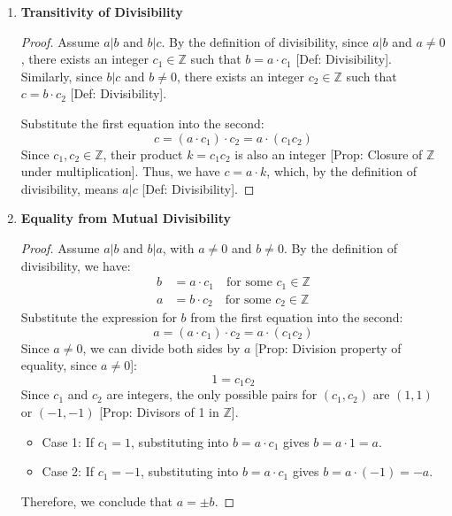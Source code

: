 \begin{enumerate}
    \item \textbf{Transitivity of Divisibility}
    \begin{proof}
        Assume $a|b$ and $b|c$. By the definition of divisibility, since $a|b$ and $a \ne 0$, there exists an integer $c_1 \in \mathbb{Z}$ such that $b = a \cdot c_1$ [Def: Divisibility].
        Similarly, since $b|c$ and $b \ne 0$, there exists an integer $c_2 \in \mathbb{Z}$ such that $c = b \cdot c_2$ [Def: Divisibility].
        
        Substitute the first equation into the second:
        $$c = (a \cdot c_1) \cdot c_2 = a \cdot (c_1 c_2)$$
        Since $c_1, c_2 \in \mathbb{Z}$, their product $k = c_1 c_2$ is also an integer [Prop: Closure of $\mathbb{Z}$ under multiplication].
        Thus, we have $c = a \cdot k$, which, by the definition of divisibility, means $a|c$ [Def: Divisibility].
    \end{proof}

    \item \textbf{Equality from Mutual Divisibility}
    \begin{proof}
        Assume $a|b$ and $b|a$, with $a \ne 0$ and $b \ne 0$.
        By the definition of divisibility, we have:
        \begin{align*}
            b &= a \cdot c_1 \quad \text{for some } c_1 \in \mathbb{Z} \\
            a &= b \cdot c_2 \quad \text{for some } c_2 \in \mathbb{Z}
        \end{align*}
        Substitute the expression for $b$ from the first equation into the second:
        $$a = (a \cdot c_1) \cdot c_2 = a \cdot (c_1 c_2)$$
        Since $a \ne 0$, we can divide both sides by $a$ [Prop: Division property of equality, since $a \ne 0$]:
        $$1 = c_1 c_2$$
        Since $c_1$ and $c_2$ are integers, the only possible pairs for $(c_1, c_2)$ are $(1, 1)$ or $(-1, -1)$ [Prop: Divisors of 1 in $\mathbb{Z}$].
        \begin{itemize}
            \item Case 1: If $c_1 = 1$, substituting into $b = a \cdot c_1$ gives $b = a \cdot 1 = a$.
            \item Case 2: If $c_1 = -1$, substituting into $b = a \cdot c_1$ gives $b = a \cdot (-1) = -a$.
        \end{itemize}
        Therefore, we conclude that $a = \pm b$.
    \end{proof}


\end{enumerate}
